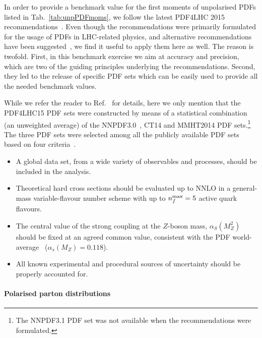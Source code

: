 In order to provide a benchmark value for the first moments of unpolarised PDFs
listed in Tab.~\ref{tab:unpPDFmoms}, we follow the latest PDF4LHC 2015 
recommendations~\cite{Butterworth:2015oua}.
%
Even though the recommendations were primarily formulated for the usage of PDFs
in LHC-related physics, and alternative recommendations have been 
suggested~\cite{Accardi:2016ndt}, we find it useful to apply them here as well.
%
The reason is twofold.
%
First, in this benchmark exercise we aim at accuracy and precision, which are 
two of the guiding principles underlying the recommendations.
%
Second, they led to the release of specific PDF sets which can be easily 
used to provide all the needed benchmark values.

While we refer the reader to Ref.~\cite{Butterworth:2015oua} for details,
here we only mention that the PDF4LHC15 PDF sets were constructed by means of
a statistical combination (an unweighted average) of the 
NNPDF3.0~\cite{Ball:2014uwa}, CT14 and MMHT2014 PDF sets.\footnote{The 
NNPDF3.1 PDF set was not available when the recommendations were formulated.}
%
The three PDF sets were selected among all the publicly available PDF sets
based on four criteria~\cite{Butterworth:2015oua}.
%
\begin{itemize}
%
\item A global data set, from a wide variety of observables and processes, 
should be included in the analysis.
%
\item Theoretical hard cross sections should be evaluated up to NNLO in a
general-mass variable-flavour number scheme with up to $n_f^{\rm max}=5$ 
active quark flavours.
%
\item The central value of the strong coupling at the $Z$-boson mass,
$\alpha_S(M_Z^2)$ should be fixed at an agreed common value, consistent 
with the PDF world-average~\cite{Olive:2016xmw} ($\alpha_s(M_Z)=0.118$).
%
\item All known experimental and procedural sources of uncertainty should be 
properly accounted for.
%
\end{itemize}
 





\paragraph{Polarised parton distributions}




